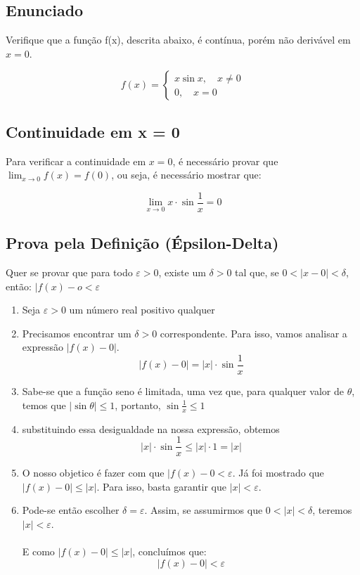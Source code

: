 

\subsection{Enunciado}

Verifique que a função f(x), descrita abaixo, é contínua, porém não derivável em $x = 0$.

\begin{equation*}
    f(x) = 
    \begin{cases}
        x\sin{x}, \quad x \neq 0 \\
        0, \quad x = 0
    \end{cases}
\end{equation*}

\subsection{Continuidade em x = 0}

Para verificar a continuidade em $x = 0$, é necessário provar que $\lim_{x\to0}f(x) = f(0)$, ou seja, 
é necessário mostrar que:

\begin{equation*}
    \lim_{x\to0}x\cdot\sin{\frac{1}{x}} = 0
\end{equation*}


\subsection{Prova pela Definição (Épsilon-Delta)}

Quer se provar que para todo $\varepsilon > 0$, existe um $\delta > 0$ tal que, se $0 < |x-0| < \delta$, então:
$|f(x) - o < \varepsilon$

\begin{enumerate}
    \item Seja $\varepsilon > 0$ um número real positivo qualquer
    \item Precisamos encontrar um $\delta > 0$ correspondente. Para isso, vamos analisar
    a expressão $|f(x) - 0|$.
    \[|f(x) - 0| = |x|\cdot\sin{\frac{1}{x}}\] 
    \item Sabe-se que a função seno é limitada, uma vez que, para qualquer
    valor de $\theta$, temos que $|\sin{\theta}| \leq 1$, portanto, $\sin{\frac{1}{x} \leq 1}$
    \item substituindo essa desigualdade na nossa expressão, obtemos
    \[|x|\cdot\sin{\frac{1}{x}} \leq |x|\cdot1 = |x|\]
    \item O nosso objetico é fazer com que $|f(x) - 0 < \varepsilon$. Já foi mostrado que
    $|f(x) - 0| \leq |x|$. Para isso, basta garantir que $|x| < \varepsilon$.
    \item Pode-se então escolher $\delta = \varepsilon$. Assim, se assumirmos que 
    $0 < |x| < \delta$, teremos $|x| < \varepsilon$. \\
    \\
    E como $|f(x) - 0| \leq |x|$, concluímos que:
    \[|f(x) - 0| < \varepsilon\]
\end{enumerate}

